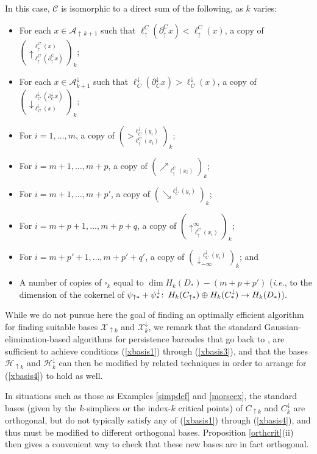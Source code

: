 \documentclass[11pt]{amsart}
\theoremstyle{definition}
\theoremstyle{remark}
\numberwithin{equation}{section}
\def\co{\colon\thinspace}
\begin{document}
In this case, $\mathcal{C}$ is isomorphic to a direct sum of the following, as $k$ varies:
\begin{itemize}
	\item For each $x\in \mathcal{A}_{\uparrow\,k+1}$ such that $\ell_{\uparrow}^{C}(\partial_{\uparrow}^{C}x)<\ell_{\uparrow}^{C}(x)$, a copy of $\left(\uparrow_{\ell_{\uparrow}^{C}(\partial_{\uparrow}^{C}x)}^{\ell_{\uparrow}^{C}(x)}\right)_k$;
\item For each $x\in \mathcal{A}^{\downarrow}_{k+1}$ such that $\ell^{\downarrow}_{C}(\partial^{\downarrow}_{C}x)>\ell^{\downarrow}_{C}(x)$, a copy of $\left(\downarrow^{\ell^{\downarrow}_{C}(\partial^{\downarrow}_{C}x)}_{\ell^{\downarrow}_{C}(x)}\right)_k$;
\item For $i=1,\ldots,m$, a copy of $\left(>_{\ell_{\uparrow}^{C}(x_i)}^{\ell^{\downarrow}_{C}(y_i)}\right)_k$;
\item For $i=m+1,\ldots,m+p$, a copy of $(\nearrow_{\ell_{\uparrow}^{C}(x_i)})_k$; 
\item For $i=m+1,\ldots,m+p'$, a copy of $(\searrow^{\ell^{\downarrow}_{C}(y_i)})_k$;
\item For $i=m+p+1,\ldots,m+p+q$, a copy of $\left(\uparrow_{\ell_{\uparrow}^{C}(x_i)}^{\infty}\right)_k$; 
\item For $i=m+p'+1,\ldots,m+p'+q'$, a copy of $\left(\downarrow^{\ell^{\downarrow}_{C}(y_i)}_{-\infty}\right)_k$; and 
\item A number of copies of $\square_k$ equal to $\dim H_k(D_*)-(m+p+p')$ (\emph{i.e.}, to the dimension of the cokernel of $\psi_{\uparrow *}+\psi^{\downarrow}_{*}\co H_k(C_{\uparrow *})\oplus H_k(C^{\downarrow}_{*})\to H_k(D_*)$).
\end{itemize}

While we do not pursue here the goal of finding an optimally efficient algorithm for finding suitable bases $\mathcal{X}_{\uparrow k}$ and $\mathcal{X}^{
\downarrow}_{k}$, we remark that the standard Gaussian-elimination-based algorithms for persistence barcodes that go back to \cite{Bar},\cite{ZC} are sufficient to achieve conditions (\ref{xbasis1}) through (\ref{xbasis3}), and that the bases $\mathcal{H}_{\uparrow k}$ and $\mathcal{H}^{\downarrow}_{k}$   can then be modified by related techniques in order to arrange for (\ref{xbasis4}) to hold as well.

In situations such as those as Examples \ref{simpdef} and \ref{morseex}, the standard bases (given by the $k$-simplices or the index-$k$ critical points) of $C_{\uparrow k}$ and $C^{\downarrow}_{k}$ are orthogonal, but do not typically satisfy any of (\ref{xbasis1}) through (\ref{xbasis4}), and thus must be modified to different orthogonal bases.  Proposition \ref{orthcrit}(ii) then gives a convenient way to check that these new bases are in fact orthogonal.
\end{document}
